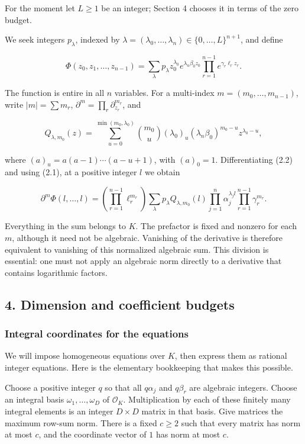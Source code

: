 \documentclass[
  11pt,
  a4paper,
]{article}
\begin{document}
For the moment let \(L\ge1\) be an integer; Section 4 chooses it in
terms of the zero budget.

We seek integers \(p_\lambda\), indexed by
\(\lambda=(\lambda_0,\ldots,\lambda_n)\in\{0,\ldots,L\}^{n+1}\), and
define

\[
\Phi(z_0,z_1,\ldots,z_{n-1})
=\sum_\lambda p_\lambda z_0^{\lambda_0}
 e^{\lambda_n\beta_0z_0}
 \prod_{r=1}^{n-1}e^{\gamma_r\ell_r z_r}. \tag{2.2}
\]

The function is entire in all \(n\) variables. For a multi-index
\(m=(m_0,\ldots,m_{n-1})\), write \(|m|=\sum m_r\),
\(\partial^m=\prod_r\partial_{z_r}^{m_r}\), and

\[
Q_{\lambda,m_0}(z)
=\sum_{u=0}^{\min(m_0,\lambda_0)}
\binom{m_0}{u}(\lambda_0)_u
(\lambda_n\beta_0)^{m_0-u}z^{\lambda_0-u}, \tag{2.3}
\]

where \((a)_u=a(a-1)\cdots(a-u+1)\), with \((a)_0=1\). Differentiating
(2.2) and using (2.1), at a positive integer \(l\) we obtain

\[
\partial^m\Phi(l,\ldots,l)
=\left(\prod_{r=1}^{n-1}\ell_r^{m_r}\right)
\sum_\lambda p_\lambda Q_{\lambda,m_0}(l)
\prod_{j=1}^n\alpha_j^{\lambda_jl}
\prod_{r=1}^{n-1}\gamma_r^{m_r}. \tag{2.4}
\]

Everything in the sum belongs to \(K\). The prefactor is fixed and
nonzero for each \(m\), although it need not be algebraic. Vanishing of
the derivative is therefore equivalent to vanishing of this normalized
algebraic sum. This division is essential: one must not apply an
algebraic norm directly to a derivative that contains logarithmic
factors.

\subsection{4. Dimension and coefficient
budgets}\label{dimension-and-coefficient-budgets}

\subsubsection{Integral coordinates for the
equations}\label{integral-coordinates-for-the-equations}

We will impose homogeneous equations over \(K\), then express them as
rational integer equations. Here is the elementary bookkeeping that
makes this possible.

Choose a positive integer \(q\) so that all \(q\alpha_j\) and
\(q\beta_r\) are algebraic integers. Choose an integral basis
\(\omega_1,\ldots,\omega_D\) of \(\mathcal O_K\). Multiplication by each
of these finitely many integral elements is an integer \(D\times D\)
matrix in that basis. Give matrices the maximum row-sum norm. There is a
fixed \(c\ge2\) such that every matrix has norm at most \(c\), and the
coordinate vector of \(1\) has norm at most \(c\).
\end{document}
